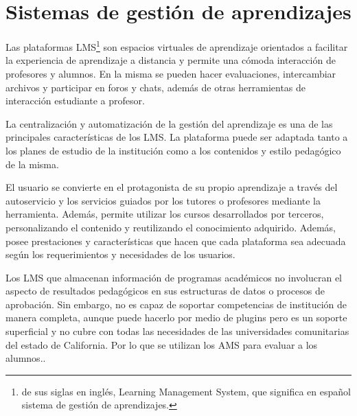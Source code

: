 \section{Sistemas de gestión de aprendizajes}
Las plataformas LMS\footnote{de sus siglas en inglés, Learning Management System, que significa en español sistema de gestión de aprendizajes.} son espacios virtuales de aprendizaje orientados a facilitar la experiencia de aprendizaje a distancia y permite una cómoda interacción de profesores y alumnos. En la misma se pueden hacer evaluaciones, intercambiar archivos y participar en foros y chats, además de otras herramientas de interacción estudiante a profesor.

La centralización y automatización de la gestión del aprendizaje es una de las principales características de los LMS. La plataforma puede ser adaptada tanto a los planes de estudio de la institución como a los contenidos y estilo pedagógico de la misma.

El usuario se convierte en el protagonista de su propio aprendizaje a través del autoservicio y los servicios guiados por los tutores o profesores mediante la herramienta. Además, permite utilizar los cursos desarrollados por terceros, personalizando el contenido y reutilizando el conocimiento adquirido. Además, posee prestaciones y características que hacen que cada plataforma sea adecuada según los requerimientos y necesidades de los usuarios.

Los LMS que almacenan información de programas académicos no involucran el aspecto de resultados pedagógicos en sus estructuras de datos o procesos de aprobación. Sin embargo, no es capaz de soportar competencias de institución de manera completa, aunque puede hacerlo por medio de plugins pero es un soporte superficial y no cubre con todas las necesidades de las universidades comunitarias del estado de California. Por lo que se utilizan los AMS para evaluar a los alumnos.\citep{aalst_workflow_2004}.